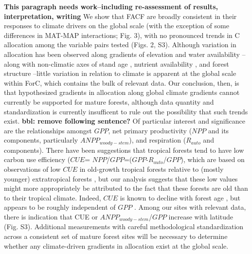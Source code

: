 \documentclass[]{article}
\begin{document}
\textbf{This paragraph needs work--including re-assessment of results,
interpretation, writing} We show that FACF are broadly consistent in
their responses to climate drivers on the global scale (with the
exception of some differences in MAT-MAP interactions; Fig. 3), with no
pronounced trends in C allocation among the variable pairs tested (Figs.
2, S3). Although variation in allocation has been observed along
gradients of elevation \citep{moser_elevation_2011} and water
availability \citep{newman_above-_2006}--along with non-climatic axes of
stand age \citep{litton_carbon_2007}, nutrient availability
\citep{litton_carbon_2007, gill_belowground_2016}, and forest structure
\citep{taylor_greater_2019}--little variation in relation to climate is
apparent at the global scale within ForC, which contains the bulk of
relevant data. Our conclusion, then, is that hypothesized gradients in
allocation along global climate gradients cannot currently be supported
for mature forests, although data quantity and standardization is
currently insufficent to rule out the possibility that such trends
exist. \textbf{bbl: remove following sentence?} Of particular interest
and significance are the relationships amongst \(GPP\), net primary
productivity (\(NPP\) and its components, particularly
\(ANPP_{woody-stem}\)), and respiration (\(R_{auto}\) and components).
There have been suggestions that tropical forests tend to have low
carbon use efficiency (\(CUE\)=
\(NPP\)/\(GPP\)=(\(GPP\)-\(R_{auto}\)/\(GPP\)), which are based on
observations of low \(CUE\) in old-growth tropical forests relative to
(mostly younger) extratropical forests
\citep{delucia_forest_2007, malhi_productivity_2012, anderson-teixeira_carbon_2016},
but our analysis suggests that these low values might more appropriately
be attributed to the fact that these forests are old than to their
tropical climate. Indeed, \(CUE\) is known to decline with forest age
\citep{delucia_forest_2007, collalti_is_2019}, but appears to be roughly
independent of \(GPP\) \citep{litton_carbon_2007}. Among our sites with
relevant data, there is indication that CUE or
\(ANPP_{woody-stem}\)/\(GPP\) increase with latitude (Fig. S3).
Additional measurements with careful methodological standardization
across a consistent set of mature forest sites will be necessary to
determine whether any climate-driven gradients in allocation exist at
the global scale.
\end{document}
